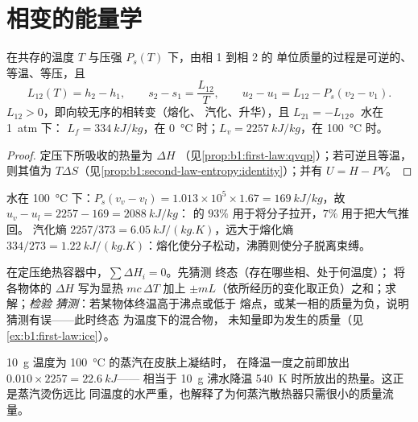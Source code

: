 \section{相变的能量学}

\begin{proposition}\label{prop:b1:phase-changes:latent}
在共存的温度 $T$ 与压强 $P_s(T)$ 下，由相 1 到相 2 的
单位质量的过程是可逆的、
等温、等压，且
\[
L_{12}(T) = h_2 - h_1 , \qquad s_2 - s_1 = \frac{L_{12}}{T} , \qquad
u_2 - u_1 = L_{12} - P_s(v_2 - v_1) .
\]
$L_{12} > 0$，即向较无序的相转变（熔化、
汽化、升华），且 $L_{21} = -L_{12}$。水在 \qty{1}{atm} 下：
$L_f = \qty{334}{kJ/kg}$，在 \qty{0}{\degreeCelsius} 时；$L_v = \qty{2257}{kJ/kg}$，在
\qty{100}{\degreeCelsius} 时。
\end{proposition}

\begin{proof}
定压下所吸收的热量为 $\Delta H$
（见\cref{prop:b1:first-law:qvqp}）；若可逆且等温，则其值为
$T\Delta S$（见\cref{prop:b1:second-law-entropy:identity}）；并有 $U = H - PV$。
\end{proof}

\begin{example}[汽化热的去向]\label{ex:b1:phase-changes:whereheat}
水在 \qty{100}{\degreeCelsius} 下：$P_s(v_v - v_l) = 1.013 \times 10^5 \times
1.67 = \qty{169}{kJ/kg}$，故 $u_v - u_l = 2257 - 169 = \qty{2088}{kJ/kg}$：
的 $93\%$ 用于将分子拉开，$7\%$
用于把大气推回。
汽化熵 $2257/373 = \qty{6.05}{kJ/(kg.K)}$，远大于熔化熵 $334/273 =
\qty{1.22}{kJ/(kg.K)}$：熔化使分子松动，沸腾则使分子脱离束缚。
\end{example}

\begin{method}[含相变的量热法]\label{meth:b1:phase-changes:calorimetry}
在定压绝热容器中，$\sum\Delta H_i = 0$。先猜测
终态（存在哪些相、处于何温度）；
将各物体的 $\Delta H$ 写为显热 $mc\,\Delta T$ 加上
$\pm mL$（依所经历的变化取正负）之和；求解；\emph{检验
猜测}：若某物体终温高于沸点或低于
熔点，或某一相的质量为负，说明猜测有误——此时终态
为温度下的混合物，
未知量即为发生的质量（见\cref{ex:b1:first-law:ice}）。
\end{method}

\begin{example}[蒸汽烫伤]\label{ex:b1:phase-changes:steam}
\qty{10}{g} 温度为 \qty{100}{\degreeCelsius} 的蒸汽在皮肤上凝结时，
在降温一度之前即放出 $0.010 \times 2257 = \qty{22.6}{kJ}$——
相当于 \qty{10}{g} 沸水降温
\qty{540}{K} 时所放出的热量。这正是蒸汽烫伤远比
同温度的水严重，也解释了为何蒸汽散热器只需很小的质量流量。
\end{example}

